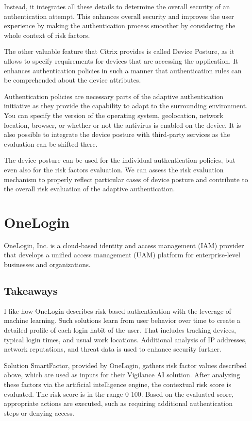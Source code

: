 Instead, it integrates all these details to determine the overall security of an authentication attempt.
This enhances overall security and improves the user experience by making the authentication process smoother by considering the whole context of risk factors.

The other valuable feature that Citrix provides is called Device Posture, as it allows to specify requirements for devices that are accessing the application. 
It enhances authentication policies in such a manner that authentication rules can be comprehended about the device attributes.

Authentication policies are necessary parts of the adaptive authentication initiative as they provide the capability to adapt to the surrounding environment.
You can specify the version of the operating system, geolocation, network location, browser, or whether or not the antivirus is enabled on the device.
It is also possible to integrate the device posture with third-party services as the evaluation can be shifted there.

The device posture can be used for the individual authentication policies, but even also for the risk factors evaluation.
We can assess the risk evaluation mechanism to properly reflect particular cases of device posture and contribute to the overall risk evaluation of the adaptive authentication.\cite{existing-citrix-device-posture}

\newpage
\section{OneLogin}

OneLogin, Inc. is a cloud-based identity and access management (IAM) provider that develops a unified access management (UAM) platform for enterprise-level businesses and organizations. \cite{existing-onelogin}

\subsection*{Takeaways}
I like how OneLogin describes risk-based authentication with the leverage of machine learning. 
Such solutions learn from user behavior over time to create a detailed profile of each login habit of the user.
That includes tracking devices, typical login times, and usual work locations.
Additional analysis of IP addresses, network reputations, and threat data is used to enhance security further.

Solution SmartFactor, provided by OneLogin, gathers risk factor values described above, which are used as inputs for their Vigilance AI solution.
After analyzing these factors via the artificial intelligence engine, the contextual risk score is evaluated.
The risk score is in the range 0-100.
Based on the evaluated score, appropriate actions are executed, such as requiring additional authentication steps or denying access.\cite{existing-onelogin} 

